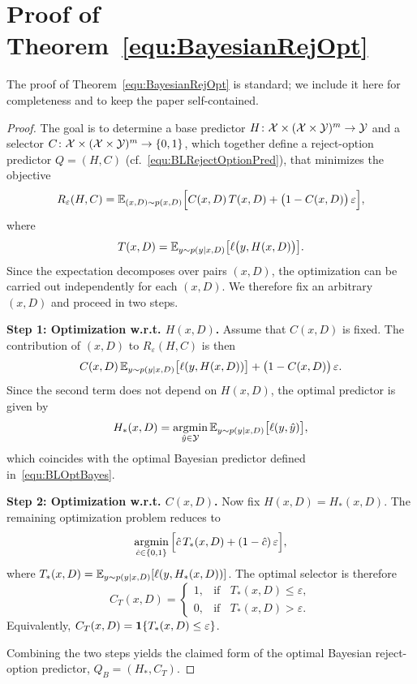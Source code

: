 

\section{Proof of Theorem~\ref{equ:BayesianRejOpt}}
\label{appendix:ProofBayesianRejOpt}


The proof of Theorem~\ref{equ:BayesianRejOpt} is standard; we include it here for completeness and to keep the paper self-contained.

\begin{proof}The goal is to determine a base predictor
\(H \colon {\cal X} \times ({\cal X} \times {\cal Y})^m \rightarrow {\cal Y}\)
and a selector \(C \colon {\cal X} \times ({\cal X} \times {\cal Y})^m \rightarrow \{0,1\}\),
which together define a reject-option predictor
\(Q = (H,C)\) (cf.~\eqref{equ:BLRejectOptionPred}),
that minimizes the objective
\[
R_{\varepsilon}(H,C)
=
{\mathbb{E}}_{(x,D)\sim p(x,D)}
\Big[
C(x,D)\,T(x,D)
+
\bigl(1 - C(x,D)\bigr)\,\varepsilon
\Big],
\]
where
\[
T(x,D)
=
{\mathbb{E}}_{y\sim p(y \mid x,D)}
\bigl[
\ell\bigl(y, H(x,D)\bigr)
\bigr].
\]
%
Since the expectation decomposes over pairs \((x,D)\), the optimization can be carried out independently for each \((x,D)\). We therefore fix an arbitrary \((x,D)\) and proceed in two steps.

\medskip
\noindent
\textbf{Step 1: Optimization w.r.t. \(H(x,D)\).}
Assume that \(C(x,D)\) is fixed.
The contribution of \((x,D)\) to \(R_{\varepsilon}(H,C)\) is then
\[
C(x,D)\,
{\mathbb{E}}_{y\sim p(y \mid x,D)}
\bigl[
\ell(y,H(x,D))
\bigr]
+
\bigl(1 - C(x,D)\bigr)\,\varepsilon .
\]
Since the second term does not depend on \(H(x,D)\), the optimal predictor is given by
\[
H_*(x,D)
=
\mathop{\rm argmin}_{\hat y \in {\cal Y}}
{\mathbb{E}}_{y\sim p(y \mid x,D)}
\bigl[
\ell(y,\hat y)
\bigr],
\]
which coincides with the optimal Bayesian predictor defined in~\eqref{equ:BLOptBayes}.


\medskip
\noindent
\textbf{Step 2: Optimization w.r.t. \(C(x,D)\).}
Now fix \(H(x,D) = H_*(x,D)\).
The remaining optimization problem reduces to
\[
\mathop{\rm argmin}_{\hat c \in \{0,1\}}
\Big[
\hat c\,T_*(x,D)
+
(1-\hat c)\,\varepsilon
\Big],
\]
where
\(
T_*(x,D)
=
{\mathbb{E}}_{y\sim p(y \mid x,D)}
[
\ell(y, H_*(x,D))
]
\).
The optimal selector is therefore
\[
C_T(x,D)
=
\begin{cases}
1, & \text{if } \;\; T_*(x,D) \le \varepsilon, \\
0, & \text{if } \;\;T_*(x,D) > \varepsilon .
\end{cases}
\]
Equivalently,
\(C_T(x,D) = \mathbf{1}{\{ {T_*(x,D) \le \varepsilon}\}}\).

Combining the two steps yields the claimed form of the optimal Bayesian reject-option predictor, $Q_B=(H_*,C_T)$.
%
\end{proof}

